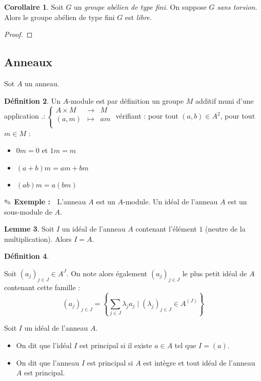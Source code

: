 \documentclass{article}
\newcommand{\dis}{\displaystyle}
\theoremstyle{definition}
\newtheorem{defi}{Définition}[section]
\newtheorem{lem}[defi]{Lemme}
\newtheorem{coro}[defi]{Corollaire}
\theoremstyle{remark}
\newcommand{\exem}{{\textbf{$\text{\ding{46}}$ Exemple : \ }}}
\newcommand{\app}[5]{#1:\left\{\begin{array}{rcl}
#2 & \longrightarrow & #3 \\
#4 & \longmapsto & #5  \\
\end{array}\right.
}
\begin{document}
\begin{coro}
Soit $G$ un \textit{groupe abélien de type fini}. On suppose $G$ \textit{sans torsion}. Alors le groupe abélien de type fini $G$ est \textit{libre}.
\end{coro}

\begin{proof}

\end{proof}

\subsection{Anneaux}

Sot $A$ un anneau.

\begin{defi}
Un $A$-module est par définition un groupe $M$ additif muni d'une application $\app{.}{A \times M}{M}{(a,m)}{am}$ vérifiant : pour tout $(a,b) \in A^2$, pour tout $m \in M$ :
\begin{itemize}
\item $0m=0$ et $1m=m$
\item $(a+b)m=am+bm$
\item $(ab)m=a(bm)$
\end{itemize}
\end{defi}

\exem L'anneau $A$ est un $A$-module. Un idéal de l'anneau $A$ est un sous-module de $A$. 

\begin{lem}
Soit $I$ un idéal de l'anneau $A$ contenant l'élément $1$ (neutre de la multiplication). Alors $I=A$.
\end{lem}

\begin{defi}
\begin{point}
\item Soit $(a_j)_{j\in J} \in A^J$. On note alors également $ (a_j)_{j\in J}$ le plus petit idéal de $A$ contenant cette famille : \[(a_j)_{j\in J}=\left\{\dis \sum_{j \in J} \lambda_ja_j \mid (\lambda_j)_{j\in J} \in A^{(J)}  \right\} \]
\item Soit $I$ un idéal de l'anneau $A$. 
\begin{itemize}
\item On dit que l'idéal $I$ est principal si il existe $a \in A$ tel que $I=(a)$.
\item On dit que l'anneau $I$ est principal si $A$ est intègre et tout idéal de l'anneau $A$ est principal.
\end{itemize} 
\end{point}
\end{defi}
\end{document}
